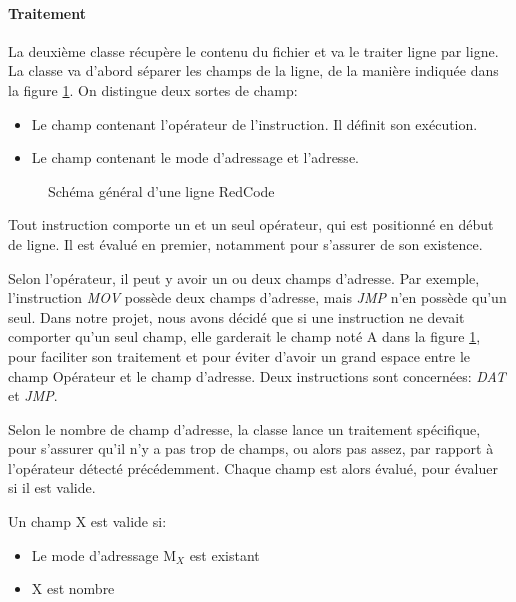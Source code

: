 \documentclass[hidelinks]{report}
\begin{document}
\paragraph{Traitement\label{paraph:traitement}}
La deuxième classe récupère le contenu du fichier et va le traiter ligne par ligne. La classe va d'abord séparer les champs de la ligne, de la manière indiquée dans la figure \ref{lineRed}. On distingue deux sortes de champ:
\begin{itemize}
    \item Le champ contenant l'opérateur de l'instruction. Il définit son exécution.
    \item Le champ contenant le mode d'adressage et l'adresse.
\end{itemize}
\begin{figure}
    \centering
{}
\caption{Schéma général d'une ligne RedCode}
    \label{lineRed}
\end{figure}

Tout instruction comporte un et un seul opérateur, qui est positionné en début de ligne. Il est évalué en premier, notamment pour s'assurer de son existence.

Selon l'opérateur, il peut y avoir un ou deux champs d'adresse. Par exemple, l'instruction \emph{MOV} possède deux champs d'adresse, mais \emph{JMP} n'en possède qu'un seul. Dans notre projet, nous avons décidé que si une instruction ne devait comporter qu'un seul champ, elle garderait le champ noté A dans la figure \ref{lineRed}, pour faciliter son traitement et pour éviter d'avoir un grand espace entre le champ Opérateur et le champ d'adresse. Deux instructions sont concernées: \emph{DAT} et \emph{JMP}.

Selon le nombre de champ d'adresse, la classe lance un traitement spécifique, pour s'assurer qu'il n'y a pas trop de champs, ou alors pas assez, par rapport à l'opérateur détecté précédemment. Chaque champ est alors évalué, pour évaluer si il est valide. 

\vspace{8mm}
Un champ X est valide si:
\begin{itemize}
    \item Le mode d'adressage M$_{X}$ est existant
    \item X est nombre 
\end{itemize}
\end{document}
